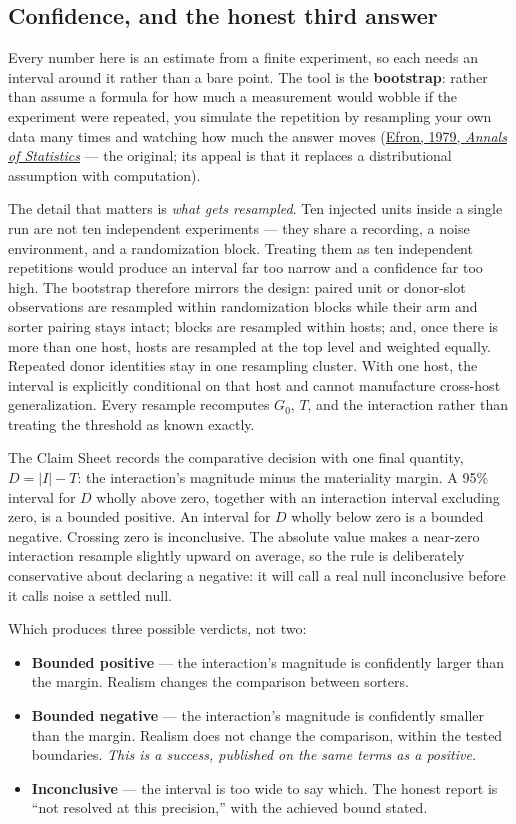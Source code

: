 \documentclass[12pt]{article}
\begin{document}
\subsection{Confidence, and the honest third answer}

Every number here is an estimate from a finite experiment, so each needs an interval around it
rather than a bare point. The tool is the \textbf{bootstrap}: rather than assume a formula for
how much a measurement would wobble if the experiment were repeated, you simulate the
repetition by resampling your own data many times and watching how much the answer moves
(\href{https://doi.org/10.1214/aos/1176344552}{Efron, 1979, \emph{Annals of Statistics}} ---
the original; its appeal is that it replaces a distributional assumption with computation).

The detail that matters is \emph{what gets resampled}. Ten injected units inside a single run
are not ten independent experiments --- they share a recording, a noise environment, and a
randomization block. Treating them as ten independent repetitions would produce an interval
far too narrow and a confidence far too high. The bootstrap therefore mirrors the design:
paired unit or donor-slot observations are resampled within randomization blocks while their
arm and sorter pairing stays intact; blocks are resampled within hosts; and, once there is
more than one host, hosts are resampled at the top level and weighted equally. Repeated donor
identities stay in one resampling cluster. With one host, the interval is explicitly
conditional on that host and cannot manufacture cross-host generalization. Every resample
recomputes $G_0$, $T$, and the interaction rather than treating the threshold as known
exactly.

The Claim Sheet records the comparative decision with one final quantity,
$D = |I| - T$: the interaction's magnitude minus the materiality margin. A 95\% interval for
$D$ wholly above zero, together with an interaction interval excluding zero, is a bounded
positive. An interval for $D$ wholly below zero is a bounded negative. Crossing zero is
inconclusive. The absolute value makes a near-zero interaction resample slightly upward on
average, so the rule is deliberately conservative about declaring a negative: it will call a
real null inconclusive before it calls noise a settled null.

Which produces three possible verdicts, not two:

\begin{itemize}
\item \textbf{Bounded positive} --- the interaction's magnitude is confidently larger than the margin.
Realism changes the comparison between sorters.
\item \textbf{Bounded negative} --- the interaction's magnitude is confidently smaller than the margin.
Realism does not change the comparison, within the tested boundaries. \emph{This is a success,
published on the same terms as a positive.}
\item \textbf{Inconclusive} --- the interval is too wide to say which. The honest report is
``not resolved at this precision,'' with the achieved bound stated.
\end{itemize}
\end{document}
